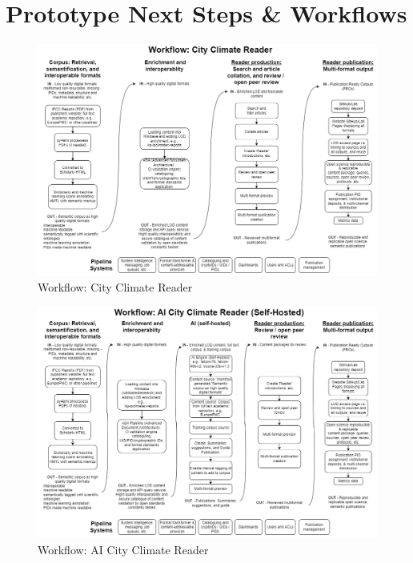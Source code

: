 \documentclass[
  letterpaper,
  DIV=11,
  numbers=noendperiod]{scrreprt}
\begin{document}

\hypertarget{prototype-next-steps-workflows}{%
\chapter{Prototype Next Steps \&
Workflows}\label{prototype-next-steps-workflows}}

\begin{figure}

{\centering \includegraphics{./workflows/city climate reader workflow v1.drawio.png}

}

\caption{Workflow: City Climate Reader}

\end{figure}

\begin{figure}

{\centering \includegraphics{./workflows/AI city climate reader workflow v1.drawio.png}

}

\caption{Workflow: AI City Climate Reader}

\end{figure}
\end{document}
